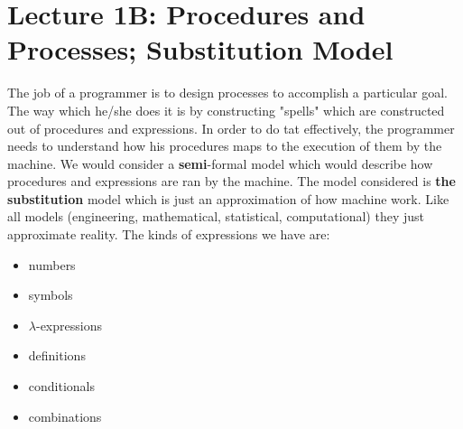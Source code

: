 \documentclass[a4paper,twoside]{article}
\numberwithin{equation}{section}
\begin{document}
\section{Lecture 1B: Procedures and Processes; Substitution Model}
The job of a programmer is to design processes to accomplish a particular goal. The way which he/she
does it is by constructing "spells" which are constructed out of procedures and expressions.
In order to do tat effectively, the programmer needs to understand how his procedures maps to the
execution of them by the machine. We would consider a \textbf{semi}-formal model which would
describe how procedures and expressions are ran by the machine. The model considered is
\textbf{the substitution} model which is just an approximation of how machine work.
Like all models (engineering, mathematical, statistical, computational) they just approximate reality.
The kinds of expressions we have are:
\begin{itemize}
    \item numbers
    \item symbols
    \item $\lambda$-expressions
    \item definitions
    \item conditionals
    \item combinations
\end{itemize}
\end{document}
